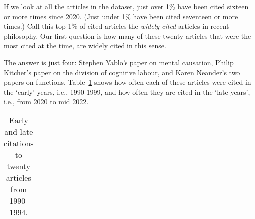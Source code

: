 \documentclass[
  10pt,
  letterpaper,
  DIV=11,
  numbers=noendperiod,
  twoside]{scrartcl}
\begin{document}
If we look at all the articles in the dataset, just over 1\% have been
cited sixteen or more times since 2020. (Just under 1\% have been cited
seventeen or more times.) Call this top 1\% of cited articles the
\emph{widely cited} articles in recent philosophy. Our first question is
how many of these twenty articles that were the most cited at the time,
are widely cited in this sense.

The answer is just four: Stephen Yablo's paper on mental causation,
Philip Kitcher's paper on the division of cognitive labour, and Karen
Neander's two papers on functions. Table~\ref{tbl-early-1990s-expanded}
shows how often each of these articles were cited in the `early' years,
i.e., 1990-1999, and how often they are cited in the `late years', i.e.,
from 2020 to mid 2022.

\begin{longtable}[]{@{}
  >{\raggedleft\arraybackslash}p{}
  >{\raggedleft\arraybackslash}p{}
  >{\raggedright\arraybackslash}p{}@{}}

\caption{\label{tbl-early-1990s-expanded}Early and late citations to
twenty articles from 1990-1994.}

\tabularnewline


\end{longtable}
\end{document}
